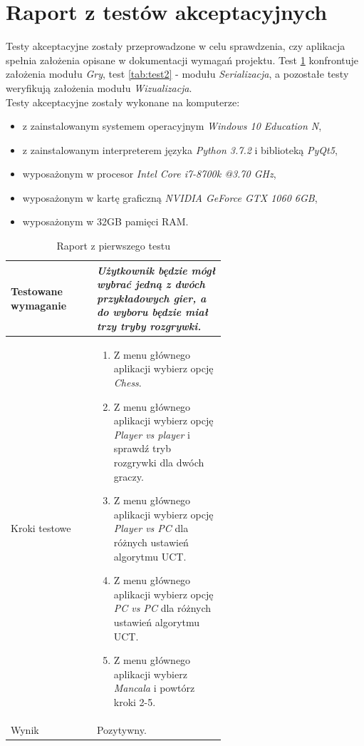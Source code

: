 \documentclass{article}
\let\oldsection\section
\renewcommand\section{\clearpage\oldsection}
\newcommand{\modulename}[1]{\textit{#1}}
\begin{document}
\section{Raport z testów akceptacyjnych}
Testy akceptacyjne zostały przeprowadzone w celu sprawdzenia, czy aplikacja spełnia założenia opisane w dokumentacji wymagań projektu. Test \ref{tab:test1} konfrontuje założenia modułu \modulename{Gry}, test \ref{tab:test2} - modułu \modulename{Serializacja}, a pozostałe testy weryfikują założenia modułu \modulename{Wizualizacja}. \\

\noindent Testy akceptacyjne zostały wykonane na komputerze:
\begin{itemize}
	\item z zainstalowanym systemem operacyjnym \modulename{Windows 10 Education N},
	\item z zainstalowanym interpreterem języka \modulename{Python 3.7.2} i biblioteką \modulename{PyQt5},
	\item wyposażonym w procesor \modulename{Intel Core i7-8700k @3.70 GHz},
	\item wyposażonym w kartę graficzną \modulename{NVIDIA GeForce GTX 1060 6GB},
	\item wyposażonym w 32GB pamięci RAM.
\end{itemize}

\begin{table}[h!]
\centering
\begin{tabular}{|l|p{0.6\linewidth}|}
	\hline
	Testowane wymaganie & \modulename{Użytkownik będzie mógł wybrać jedną z dwóch przykładowych gier, a do wyboru będzie miał trzy tryby rozgrywki.} \\ \hline
	Kroki testowe & \begin{enumerate} \item Z menu głównego aplikacji wybierz opcję \modulename{Chess}. \item Z menu głównego aplikacji wybierz opcję \modulename{Player vs player} i sprawdź tryb rozgrywki dla dwóch graczy. \item Z menu głównego aplikacji wybierz opcję \modulename{Player vs PC} dla różnych ustawień algorytmu UCT. \item Z menu głównego aplikacji wybierz opcję \modulename{PC vs PC} dla różnych ustawień algorytmu UCT. \item Z menu głównego aplikacji wybierz \modulename{Mancala} i powtórz kroki 2-5. \end{enumerate} \\ \hline
	Wynik & Pozytywny. \\ \hline
\end{tabular}
\caption{Raport z pierwszego testu}
\label{tab:test1}
\end{table}
\end{document}
